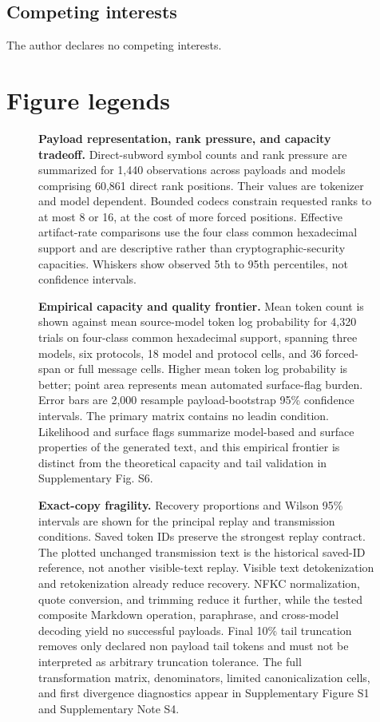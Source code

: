 \documentclass[fleqn,10pt]{wlscirep}
\begin{document}
\subsection*{Competing interests}

The author declares no competing interests.

\section*{Figure legends}
\begin{figure}[H]
\caption{\label{fig:capacity}\textbf{Payload representation, rank pressure, and capacity tradeoff.} Direct-subword symbol counts and rank pressure are summarized for 1,440 observations across payloads and models comprising 60,861 direct rank positions. Their values are tokenizer and model dependent. Bounded codecs constrain requested ranks to at most 8 or 16, at the cost of more forced positions. Effective artifact-rate comparisons use the four class common hexadecimal support and are descriptive rather than cryptographic-security capacities. Whiskers show observed 5th to 95th percentiles, not confidence intervals.}
\end{figure}
\begin{figure}[H]
\caption{\label{fig:empirical-frontier}\textbf{Empirical capacity and quality frontier.} Mean token count is shown against mean source-model token log probability for 4,320 trials on four-class common hexadecimal support, spanning three models, six protocols, 18 model and protocol cells, and 36 forced-span or full message cells. Higher mean token log probability is better; point area represents mean automated surface-flag burden. Error bars are 2,000 resample payload-bootstrap 95\% confidence intervals. The primary matrix contains no leadin condition. Likelihood and surface flags summarize model-based and surface properties of the generated text, and this empirical frontier is distinct from the theoretical capacity and tail validation in Supplementary Fig. S6.}
\end{figure}
\begin{figure}[H]
\caption{\label{fig:robustness}\textbf{Exact-copy fragility.} Recovery proportions and Wilson 95\% intervals are shown for the principal replay and transmission conditions. Saved token IDs preserve the strongest replay contract. The plotted unchanged transmission text is the historical saved-ID reference, not another visible-text replay. Visible text detokenization and retokenization already reduce recovery. NFKC normalization, quote conversion, and trimming reduce it further, while the tested composite Markdown operation, paraphrase, and cross-model decoding yield no successful payloads. Final 10\% tail truncation removes only declared non payload tail tokens and must not be interpreted as arbitrary truncation tolerance. The full transformation matrix, denominators, limited canonicalization cells, and first divergence diagnostics appear in Supplementary Figure S1 and Supplementary Note S4.}
\end{figure}
\end{document}
